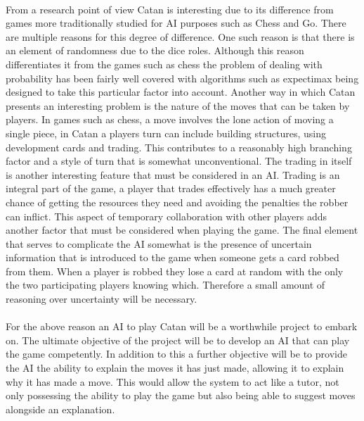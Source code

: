\documentclass[]{article}
\begin{document}
\paragraph{}
From a research point of view Catan is interesting due to its difference from games more traditionally studied for AI purposes such as Chess and Go. There are multiple reasons for this degree of difference. One such reason is that there is an element of randomness due to the dice roles. Although this reason differentiates it from the games such as chess the problem of dealing with probability has been fairly well covered with algorithms such as expectimax being designed to take this particular factor into account. Another way in which Catan presents an interesting problem is the nature of the moves that can be taken by players. In games such as chess, a move involves the lone action of moving a single piece, in Catan a players turn can include building structures, using development cards and trading. This contributes to a reasonably high branching factor and a style of turn that is somewhat unconventional. The trading in itself is another interesting feature that must be considered in an AI. Trading is an integral part of the game, a player that trades effectively has a much greater chance of getting the resources they need and avoiding the penalties the robber can inflict. This aspect of temporary collaboration with other players adds another factor that must be considered when playing the game. The final element that serves to complicate the AI somewhat is the presence of uncertain information that is introduced to the game when someone gets a card robbed from them. When a player is robbed they lose a card at random with the only the two participating players knowing which. Therefore a small amount of reasoning over uncertainty will be necessary.

\paragraph{}
For the above reason an AI to play Catan will be a worthwhile project to embark on. The ultimate objective of the project will be to develop an AI that can play the game competently. In addition to this a further objective will be to provide the AI the ability to explain the moves it has just made, allowing it to explain why it has made a move. This would allow the system to act like a tutor, not only possessing the ability to play the game but also being able to suggest moves alongside an explanation. 
\end{document}
